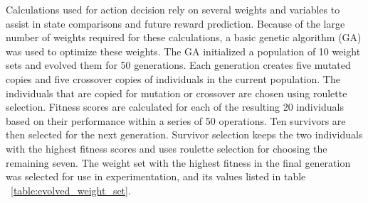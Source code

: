 Calculations used for action decision rely on several weights and variables to assist in state comparisons and future reward prediction.
Because of the large number of weights required for these calculations, a basic genetic algorithm (GA) was used to optimize these weights.
The GA initialized a population of 10 weight sets and evolved them for 50 generations.
Each generation creates five mutated copies and five crossover copies of individuals in the current population.
The individuals that are copied for mutation or crossover are chosen using roulette selection.
Fitness scores are calculated for each of the resulting 20 individuals based on their performance within a series of 50 operations.
Ten survivors are then selected for the next generation.
Survivor selection keeps the two individuals with the highest fitness scores and uses roulette selection for choosing the remaining seven.
The weight set with the highest fitness in the final generation was selected for use in experimentation, and its values listed in table ~\ref{table:evolved_weight_set}.


